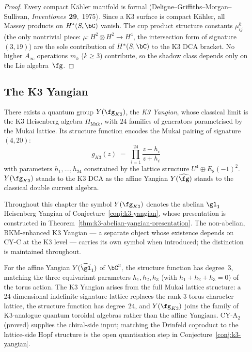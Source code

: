\begin{proof}
Every compact K\"ahler manifold is formal
(Deligne--Griffiths--Morgan--Sullivan,
\emph{Inventiones}~\textbf{29},~1975).
Since a K3 surface is compact K\"ahler, all Massey products on
$H^*(S, \bC)$ vanish.
The cup product structure constants $\mu^k_{ij}$ (the only
nontrivial piece: $\mu \colon H^2 \otimes H^2 \to H^4$,
the intersection form of signature~$(3, 19)$) are the sole
contribution of $H^*(S, \bC)$ to the K3 DCA bracket.
No higher $A_\infty$ operations $m_k$ ($k \geq 3$) contribute,
so the shadow class depends only on the Lie algebra~$\fg$.
\end{proof}

\subsection{The K3 Yangian}
\label{subsec:k3-yangian}

\begin{conjecture}
\label{conj:k3-yangian}
\ClaimStatusConjectured
There exists a quantum group $Y(\fg_{K3})$, the \emph{K3 Yangian},
whose classical limit is the K3 Heisenberg algebra $H_{\mathrm{Muk}}$,
with $24$ families of generators parametrised by the Mukai lattice.
Its structure function encodes the Mukai pairing of
signature~$(4, 20)$:
\[
 g_{K3}(z) \;=\;
 \prod_{i=1}^{24} \frac{z - h_i}{z + h_i}
\]
with parameters $h_1, \ldots, h_{24}$ constrained by the lattice
structure $U^4 \oplus E_8(-1)^2$. $Y(\fg_{K3})$ stands to the K3 DCA
as the affine Yangian $Y(\widehat{\fg})$ stands to the classical
double current algebra.
\end{conjecture}

\begin{remark}
\label{rem:k3-yangian-symbol-scope}
Throughout this chapter the symbol $Y(\fg_{K3})$ denotes the abelian
$\gl_1$ Heisenberg Yangian of Conjecture~\ref{conj:k3-yangian}, whose
presentation is constructed in
Theorem~\ref{thm:k3-abelian-yangian-presentation}. The non-abelian,
BKM-enhanced K3 Yangian — a separate object whose existence depends
on CY-C at the K3 level — carries its own symbol when introduced; the
distinction is maintained throughout.
\end{remark}

\begin{remark}
\label{rem:k3-yangian-obstruction}
For the affine Yangian $Y(\widehat{\gl}_1)$ of $\bC^3$, the structure
function has degree~$3$, matching the three equivariant parameters
$h_1, h_2, h_3$ (with $h_1 + h_2 + h_3 = 0$) of the torus action.
The K3 Yangian arises from the full Mukai lattice structure: a
$24$-dimensional indefinite-signature lattice replaces the rank-$3$
torus character lattice, the structure function has degree~$24$, and
$Y(\fg_{K3})$ joins the family of K3-analogue quantum toroidal algebras
rather than the affine Yangians. CY-A$_2$ (proved) supplies the
chiral-side input; matching the Drinfeld coproduct to the lattice-side
Hopf structure is the open quantisation step in
Conjecture~\ref{conj:k3-yangian}.
\end{remark}

